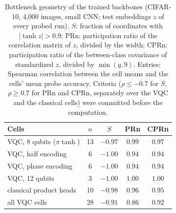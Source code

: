 \begin{table}[h]
\centering
\caption{Bottleneck geometry of the trained backbones (CIFAR-10, 4,000 images, small CNN; test
embeddings $z$ of every probed run). $S$: fraction of coordinates with $|\tanh z|>0.9$; PRn:
participation ratio of the correlation matrix of $z$, divided by the width; CPRn: participation ratio
of the between-class covariance of standardized $z$, divided by $\min(q,9)$. Entries: Spearman
correlation between the cell means and the cells' mean probe accuracy. Criteria ($\rho\le-0.7$ for $S$,
$\rho\ge0.7$ for PRn and CPRn, separately over the VQC and the classical cells) were committed before
the computation.}
\label{tab:geometry}
\small
\begin{tabular}{lcccc}
\toprule
Cells & $n$ & $S$ & PRn & CPRn \\
\midrule
VQC, 8 qubits ($\pi\tanh$) & 13 & $-0.97$ & $0.99$ & $0.97$ \\
VQC, half encoding & 6 & $-1.00$ & $0.94$ & $0.94$ \\
VQC, phase encoding & 6 & $-1.00$ & $0.94$ & $0.94$ \\
VQC, 12 qubits & 3 & $-1.00$ & $1.00$ & $1.00$ \\
classical product heads & 10 & $-0.98$ & $0.96$ & $0.95$ \\
\midrule
all VQC cells & 28 & $-0.91$ & $0.86$ & $0.92$ \\
\bottomrule
\end{tabular}
\end{table}
